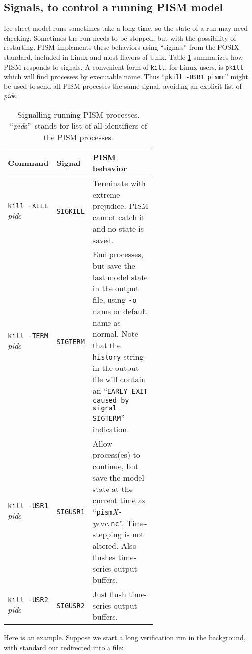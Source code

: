 \newcommand\pid{\textsl{pid}s}

\subsection{Signals, to control a running PISM model} \label{subsect:signal}    Ice sheet model runs sometimes take a long time, so the state of a run may need checking.  Sometimes the run needs to be stopped, but with the possibility of restarting.  PISM implements these behaviors using ``signals'' from the POSIX standard, included in Linux and most flavors of Unix.  Table \ref{tab:signals} summarizes how PISM responds to signals.  A convenient form of \texttt{kill}, for Linux users, is \texttt{pkill} which will find processes by executable name.  Thus ``\texttt{pkill -USR1 pismr}'' might be used to send all PISM processes the same signal, avoiding an explicit list of \pid.

\begin{table}[ht]
\centering
\begin{tabular}{llp{0.60\linewidth}}\toprule
\textbf{Command} & \textbf{Signal} & \textbf{PISM behavior} \\
\midrule
\texttt{kill -KILL} \pid & \texttt{SIGKILL} & Terminate with extreme prejudice. PISM cannot catch it and no state is saved. \\
\texttt{kill -TERM} \pid & \texttt{SIGTERM} & End processes, but save the last model state in the output file, using \texttt{-o} name or default name as normal.  Note that the \texttt{history} string in the output file will contain an ``\texttt{EARLY EXIT caused by signal SIGTERM}'' indication. \\
\texttt{kill -USR1} \pid & \texttt{SIGUSR1} & Allow process(es) to continue, but save the model state at the current time as ``\texttt{pism}\textsl{X}\texttt{-}\textsl{year}\texttt{.nc}''.  Time-stepping is not altered.  Also flushes time-series output buffers. \\
\texttt{kill -USR2} \pid & \texttt{SIGUSR2} & Just flush time-series output buffers.\index{signals!USR2} \\
\bottomrule
\end{tabular}
\label{tab:signals}
\caption{Signalling running PISM processes.  ``\pid''~stands for list of all identifiers of the PISM processes.}
\end{table}

Here is an example.  Suppose we start a long verification run in the
background, with standard out redirected into a file: 

